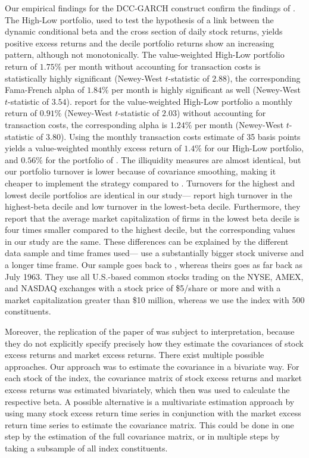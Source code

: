 \documentclass[11pt,a4paper]{article}
\begin{document}
Our empirical findings for the DCC-GARCH construct confirm the findings of . The High-Low portfolio, used to test the hypothesis of a link between the dynamic conditional beta and the cross section of daily stock returns, yields positive excess returns and the decile portfolio returns show an increasing pattern, although not monotonically. The value-weighted High-Low portfolio return of $1.75\%$ per month without accounting for transaction costs is statistically highly significant (Newey-West $t$-statistic of $2.88$), the corresponding Fama-French alpha of $1.84\%$ per month is highly significant as well (Newey-West $t$-statistic of $3.54$).  report for the value-weighted High-Low portfolio a monthly return of $0.91\%$ (Newey-West $t$-statistic of $2.03$) without accounting for transaction costs, the corresponding alpha is $1.24\%$ per month (Newey-West $t$-statistic of $3.80$). Using the monthly transaction costs estimate of 35 basis points yields a value-weighted monthly excess return of $1.4\%$ for our High-Low portfolio, and $0.56\%$ for the portfolio of . The illiquidity measures are almost identical, but our portfolio turnover is lower because of covariance smoothing, making it cheaper to implement the strategy compared to . Turnovers for the highest and lowest decile portfolios are identical in our study--- report high turnover in the highest-beta decile and low turnover in the lowest-beta decile. Furthermore, they report that the average market capitalization of firms in the lowest beta decile is four times smaller compared to the highest decile, but the corresponding values in our study are the same. These differences can be explained by the different data sample and time frames used--- use a substantially bigger stock universe and a longer time frame. Our sample goes back to \periodFrom{}, whereas theirs goes as far back as July 1963. They use all U.S.-based common stocks trading on the NYSE, AMEX, and NASDAQ exchanges with a stock price of \$5/share or more and with a market capitalization greater than \$10 million, whereas we use the \indexName{} index with 500 constituents.

Moreover, the replication of the paper of  was subject to interpretation, because they do not explicitly specify precisely how they estimate the covariances of stock excess returns and market excess returns. There exist multiple possible approaches. Our approach was to estimate the covariance in a bivariate way. For each stock of the \indexName{} index, the covariance matrix of stock excess returns and market excess returns was estimated bivariately, which then was used to calculate the respective beta. A possible alternative is a multivariate estimation approach by using many stock excess return time series in conjunction with the market excess return time series to estimate the covariance matrix. This could be done in one step by the estimation of the full covariance matrix, or in multiple steps by taking a subsample of all index constituents.
\end{document}
